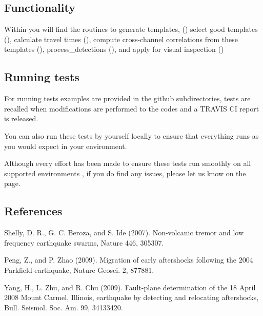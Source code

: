 \documentclass[a4paper,10pt,english]{sphinxmanual}
\begin{document}
\subsection{Functionality}
\label{\detokenize{intro:functionality}}
Within {\hyperref[\detokenize{input::doc}]{}} you will find the routines to generate templates,
({\hyperref[\detokenize{sub/input.create_templates::doc}]{}}) select good templates
({\hyperref[\detokenize{sub/input.template_check::doc}]{}}), calculate travel times
({\hyperref[\detokenize{sub/input.calculate_ttimes::doc}]{}}),
compute cross-channel correlations from these templates
({\hyperref[\detokenize{sub/main.pympa::doc}]{}}), process\_detections
({\hyperref[\detokenize{sub/output.process_detections::doc}]{}}), and apply for visual inspection
({\hyperref[\detokenize{sub/output.verify_detection::doc}]{}})


\subsection{Running tests}
\label{\detokenize{intro:running-tests}}
For running tests examples are provided in the github subdirectories, tests are recalled
when modifications are performed to the codes and a TRAVIS CI report is released.

You can also run these tests by yourself locally to ensure
that everything runs as you would expect in your environment.

Although every effort has been made to ensure these tests run smoothly on all supported environments
, if you do find any issues, please let us know on the
 page.


\subsection{References}
\label{\detokenize{intro:references}}
Shelly, D. R., G. C. Beroza, and S. Ide (2007). Non-volcanic tremor and low
frequency earthquake swarms, Nature 446, 305\textendash{}307.

Peng, Z., and P. Zhao (2009). Migration of early aftershocks following the
2004 Parkfield earthquake, Nature Geosci. 2, 877\textendash{}881.

Yang, H., L. Zhu, and R. Chu (2009). Fault-plane determination of the
18 April 2008 Mount Carmel, Illinois, earthquake by detecting and
relocating aftershocks, Bull. Seismol. Soc. Am. 99, 3413\textendash{}3420.
\end{document}
